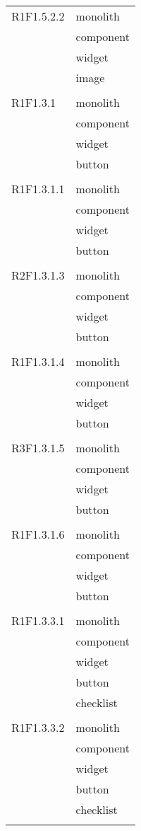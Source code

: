 \begin{center}
\begin{longtable}{|p{7cm}|p{7cm}|}
		R1F1.5.2.2 & monolith \\ & component \\ & widget \\ & image \\ & \\ \hline
		R1F1.3.1 & monolith \\ & component \\ & widget \\ & button \\ & \\ \hline
		R1F1.3.1.1 & monolith \\ & component \\ & widget \\ & button \\ & \\ \hline
		R2F1.3.1.3 & monolith \\ & component \\ & widget \\ & button \\ & \\ \hline
		R1F1.3.1.4 & monolith \\ & component \\ & widget \\ & button \\ & \\ \hline
		R3F1.3.1.5 & monolith \\ & component \\ & widget \\ & button \\ & \\ \hline
		R1F1.3.1.6 & monolith \\ & component \\ & widget \\ & button \\ & \\ \hline
		R1F1.3.3.1 & monolith \\ & component \\ & widget \\ & button \\ & checklist \\ & \\ \hline
		R1F1.3.3.2 & monolith \\ & component \\ & widget \\ & button \\ & checklist \\ & \\ \hline

\end{longtable}
\end{center}
